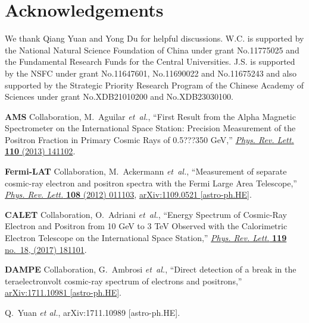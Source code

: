 \documentclass[aps,prd,letterpaper,showpacs,twocolumn,preprintnumbers,floatfix,superscriptaddress]{revtex4-1}
\begin{document}
\section{Acknowledgements}
We thank Qiang Yuan and Yong Du for helpful discussions.
W.C. is supported by the National Natural Science 
Foundation of China under grant No.11775025 and the Fundamental Research Funds 
for the Central Universities. 
J.S. is supported by the NSFC under grant No.11647601, No.11690022 and No.11675243 and also supported by the Strategic Priority Research Program of the Chinese Academy of Sciences under grant No.XDB21010200 and No.XDB23030100.

%
%
%
\begin{thebibliography}{99}
{\bfseries AMS} Collaboration, M.~Aguilar {\em et~al.}, ``{First Result from
  the Alpha Magnetic Spectrometer on the International Space Station: Precision
  Measurement of the Positron Fraction in Primary Cosmic Rays of 0.5???350
  GeV},''
\href{http://dx.doi.org/10.1103/PhysRevLett.110.141102}{{\em Phys. Rev. Lett.}
  {\bfseries 110} (2013) 141102}.

{\bfseries Fermi-LAT} Collaboration, M.~Ackermann {\em et~al.}, ``{Measurement
  of separate cosmic-ray electron and positron spectra with the Fermi Large
  Area Telescope},''
  \href{http://dx.doi.org/10.1103/PhysRevLett.108.011103}{{\em Phys. Rev.
  Lett.} {\bfseries 108} (2012) 011103},
\href{http://arxiv.org/abs/1109.0521}{{\ttfamily arXiv:1109.0521
  [astro-ph.HE]}}.

{\bfseries CALET} Collaboration, O.~Adriani {\em et~al.}, ``{Energy Spectrum of
  Cosmic-Ray Electron and Positron from 10 GeV to 3 TeV Observed with the
  Calorimetric Electron Telescope on the International Space Station},''
\href{http://dx.doi.org/10.1103/PhysRevLett.119.181101}{{\em Phys. Rev. Lett.}
  {\bfseries 119} no.~18, (2017) 181101}.

{\bfseries DAMPE} Collaboration, G.~Ambrosi {\em et~al.}, ``{Direct detection
  of a break in the teraelectronvolt cosmic-ray spectrum of electrons and
  positrons},''
\href{http://arxiv.org/abs/1711.10981}{{\ttfamily arXiv:1711.10981
  [astro-ph.HE]}}.


  Q.~Yuan {\it et al.},
  arXiv:1711.10989 [astro-ph.HE].
  

\end{thebibliography}
\end{document}
